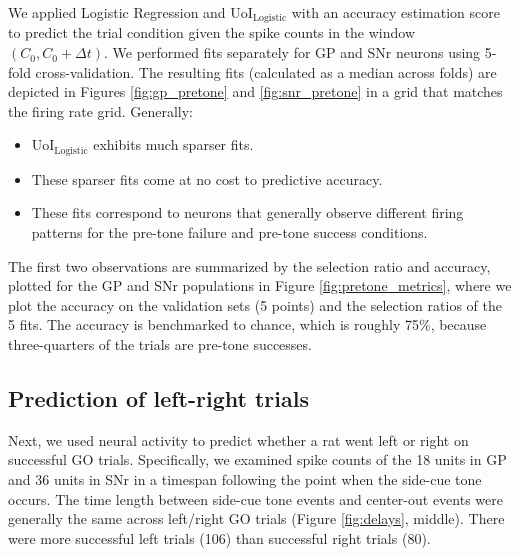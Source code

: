 \documentclass[11pt]{article}
\begin{document}
We applied Logistic Regression and UoI$_{\text{Logistic}}$ with an accuracy estimation score to predict the trial condition given the spike counts in the window $(C_0, C_0 + \Delta t)$. We performed fits separately for GP and SNr neurons using 5-fold cross-validation. The resulting fits (calculated as a median across folds) are depicted in Figures \ref{fig:gp_pretone} and \ref{fig:snr_pretone} in a grid that matches the firing rate grid. Generally:
\begin{itemize}
	\item UoI$_{\text{Logistic}}$ exhibits much sparser fits.
	\item These sparser fits come at no cost to predictive accuracy.
	\item These fits correspond to neurons that generally observe different firing patterns for the pre-tone failure and pre-tone success conditions.
\end{itemize}

The first two observations are summarized by the selection ratio and accuracy, plotted for the GP and SNr populations in Figure \ref{fig:pretone_metrics}, where we plot the accuracy on the validation sets (5 points) and the selection ratios of the 5 fits. The accuracy is benchmarked to chance, which is roughly 75\%, because three-quarters of the trials are pre-tone successes.

\subsection{Prediction of left-right trials}
Next, we used neural activity to predict whether a rat went left or right on successful GO trials. Specifically, we examined spike counts of the 18 units in GP  and 36 units in SNr in a timespan following the point when the side-cue tone occurs. The time length between side-cue tone events and center-out events were generally the same across left/right GO trials (Figure \ref{fig:delays}, middle). There were more successful left trials (106) than successful right trials (80).
\end{document}
